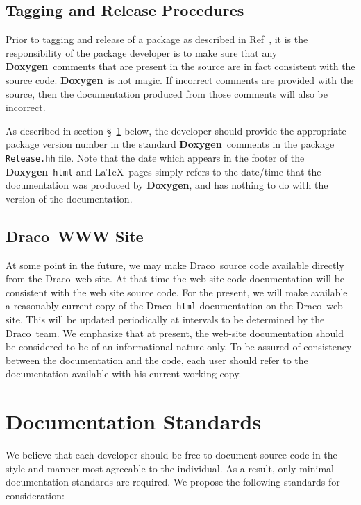 \documentclass[11pt]{ResearchNote}
\newcommand{\draco}{{\normalfont\sffamily Draco}}
\newcommand{\doxy}{{\normalfont\bfseries Doxygen}}
\begin{document}
\subsection{Tagging and Release Procedures}
\label{sec:reltag}
Prior to tagging and release of a package as described in Ref~\cite{xtm:9936},
 it is 
the responsibility of the package developer is to make sure that any \doxy\
comments that are present in the source are in fact consistent with the
source code. \doxy\ is not magic. If incorrect comments are provided with
the source, then the documentation produced from those comments will also
be incorrect.

As described in section \S~\ref{sec:std} below, 
the developer should provide 
the appropriate package version number in the standard \doxy\ comments in the 
package \texttt{Release.hh} file.
Note that the date which appears in the footer of the \doxy\ 
\texttt{html} and \LaTeX\ pages
simply refers to the date/time that the documentation was produced by \doxy, 
and has nothing to do with the version of the documentation.

\subsection{\draco\ WWW Site}
\label{sec:www}

At some point in the future, we may make \draco\ source code available
directly from the \draco\ web site. At that time the web site code
documentation will be consistent with the web site source code.
For the present, 
we will make available a reasonably current copy of the \draco\ \texttt{html}
documentation on the \draco\ web site. This will be updated periodically
at intervals to be determined by the \draco\ team. 
We emphasize that at present, the web-site documentation should be 
considered to be of an informational nature only. To be assured of
consistency between the documentation and the code, each
user should refer to the documentation available with 
his current working copy.



\section{Documentation Standards}
\label{sec:std}

We believe that each developer should be free to document source code
in the style and manner most agreeable to the individual. As a result,
only minimal documentation standards are required.  We propose the
following standards for consideration:
\end{document}
